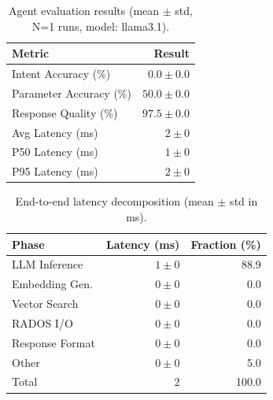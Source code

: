 
\begin{table}[t]
\centering
\caption{Agent evaluation results (mean $\pm$ std, N=1 runs, model: llama3.1).}
\label{tab:eval-results}
\begin{tabular}{lr}
\toprule
\textbf{Metric} & \textbf{Result} \\
\midrule
Intent Accuracy (\%) & $0.0 \pm 0.0$ \\
Parameter Accuracy (\%) & $50.0 \pm 0.0$ \\
Response Quality (\%) & $97.5 \pm 0.0$ \\
\midrule
Avg Latency (ms) & $2 \pm 0$ \\
P50 Latency (ms) & $1 \pm 0$ \\
P95 Latency (ms) & $2 \pm 0$ \\
\bottomrule
\end{tabular}
\end{table}


\begin{table}[t]
\centering
\caption{End-to-end latency decomposition (mean $\pm$ std in ms).}
\label{tab:latency-decomp}
\begin{tabular}{lrr}
\toprule
\textbf{Phase} & \textbf{Latency (ms)} & \textbf{Fraction (\%)} \\
\midrule
LLM Inference & $1 \pm 0$ & 88.9 \\
Embedding Gen. & $0 \pm 0$ & 0.0 \\
Vector Search & $0 \pm 0$ & 0.0 \\
RADOS I/O & $0 \pm 0$ & 0.0 \\
Response Format & $0 \pm 0$ & 0.0 \\
Other & $0 \pm 0$ & 5.0 \\
\midrule
Total & $2$ & 100.0 \\
\bottomrule
\end{tabular}
\end{table}
